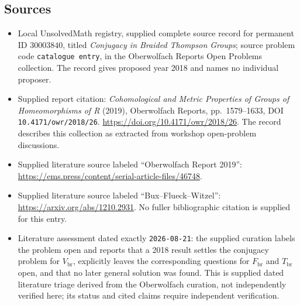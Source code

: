 \documentclass[11pt]{article}
\begin{document}
\subsection{Sources}
\begin{itemize}
\item Local UnsolvedMath registry, supplied complete source record for permanent ID \(30003840\), titled \emph{Conjugacy in Braided Thompson Groups}; source problem code \texttt{catalogue entry}, in the Oberwolfach Reports Open Problems collection. The record gives proposed year 2018 and names no individual proposer.
\item Supplied report citation: \emph{Cohomological and Metric Properties of Groups of Homeomorphisms of R} (2019), Oberwolfach Reports, pp.~1579--1633, DOI \texttt{10.4171/owr/2018/26}. \url{https://doi.org/10.4171/owr/2018/26}. The record describes this collection as extracted from workshop open-problem discussions.
\item Supplied literature source labeled ``Oberwolfach Report 2019'': \url{https://ems.press/content/serial-article-files/46748}.
\item Supplied literature source labeled ``Bux--Flueck--Witzel'': \url{https://arxiv.org/abs/1210.2931}. No fuller bibliographic citation is supplied for this entry.
\item Literature assessment dated exactly \texttt{2026-08-21}: the supplied curation labels the problem open and reports that a 2018 result settles the conjugacy problem for \(V_{\mathrm{br}}\), explicitly leaves the corresponding questions for \(F_{\mathrm{br}}\) and \(T_{\mathrm{br}}\) open, and that no later general solution was found. This is supplied dated literature triage derived from the Oberwolfach curation, not independently verified here; its status and cited claims require independent verification.
\end{itemize}
\end{document}
